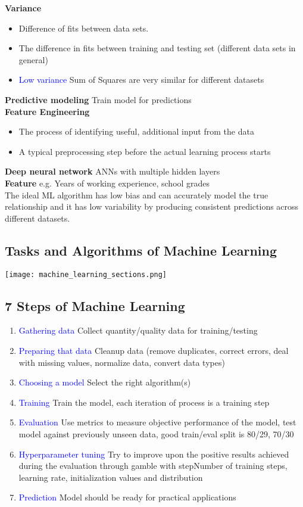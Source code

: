 \textbf{Variance}
\begin{itemize}
    \item Difference of fits between data sets.\\
    \item The difference in fits between training and testing set (different data sets in general)
    \item \textcolor{blue}{Low variance} Sum of Squares are very similar for different datasets
\end{itemize}
\textbf{Predictive modeling} Train model for predictions \\
\textbf{Feature Engineering}
\begin{itemize}
    \item The process of identifying useful, additional input from the data
    \item A typical preprocessing step before the actual learning process starts
\end{itemize}
\textbf{Deep neural network} ANNs with multiple hidden layers \\

\textbf{Feature} e.g. Years of working experience, school grades \\
The ideal ML algorithm has low bias and can accurately model the true relationship and it has low variability by producing consistent predictions across different datasets.

\subsection{Tasks and Algorithms of Machine Learning}
\texttt{[image: machine\_learning\_sections.png]}

\subsection{7 Steps of Machine Learning}
\begin{enumerate}
    \item \textcolor{blue}{Gathering data} Collect quantity/quality data for training/testing
    \item \textcolor{blue}{Preparing that data} Cleanup data (remove duplicates, correct errors, deal with missing values, normalize data, convert data types)
    \item \textcolor{blue}{Choosing a model} Select the right algorithm(s)
    \item \textcolor{blue}{Training} Train the model, each iteration of process is a training step
    \item \textcolor{blue}{Evaluation} Use metrics to measure objective performance of the model, test model against previously unseen data, good train/eval split is 80/29, 70/30
    \item \textcolor{blue}{Hyperparameter tuning} Try to improve upon the positive results achieved during the evaluation through gamble with stepNumber of training steps, learning rate, initialization values and distribution
    \item \textcolor{blue}{Prediction} Model should be ready for practical applications
\end{enumerate}
